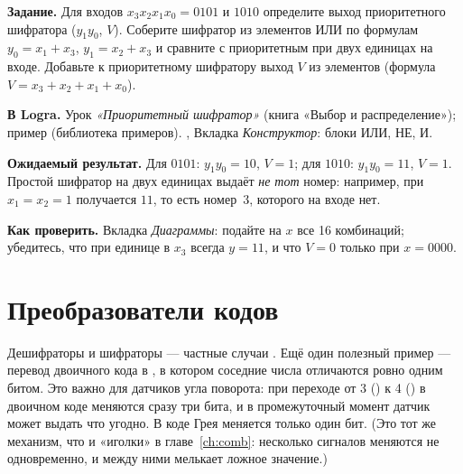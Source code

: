 \begin{diybox}
\textbf{Задание.}  Для входов $x_3x_2x_1x_0=0101$ и $1010$
определите выход приоритетного шифратора ($y_1y_0$, $V$). 
Соберите шифратор из элементов ИЛИ по формулам $y_0=x_1+x_3$,
$y_1=x_2+x_3$ и сравните с приоритетным при двух единицах на входе.
 Добавьте к приоритетному шифратору выход $V$ из элементов
(формула $V=x_3+x_2+x_1+x_0$).

\textbf{В Logra.}  Урок \emph{«Приоритетный шифратор»} (книга
«Выбор и распределение»); пример  (библиотека примеров).
,  Вкладка \emph{Конструктор}: блоки ИЛИ, НЕ, И.

\textbf{Ожидаемый результат.} Для $0101$: $y_1y_0=10$, $V=1$; для $1010$:
$y_1y_0=11$, $V=1$. Простой шифратор на двух единицах выдаёт
\emph{не тот} номер: например, при $x_1=x_2=1$ получается $11$, то есть
номер~3, которого на входе нет.

\textbf{Как проверить.} Вкладка \emph{Диаграммы}: подайте на $x$ все
16 комбинаций; убедитесь, что при единице в $x_3$ всегда $y=11$,
и что $V=0$ только при $x=0000$.
\end{diybox}

\section{Преобразователи кодов}

Дешифраторы и шифраторы --- частные случаи .
Ещё один полезный пример --- перевод двоичного кода в , в
котором соседние числа отличаются ровно одним битом. Это важно для датчиков
угла поворота: при переходе от 3 () к 4 () в двоичном коде
меняются сразу три бита, и в промежуточный момент датчик может выдать
что угодно. В коде Грея меняется только один бит. (Это тот же
механизм, что и «иголки» в главе~\ref{ch:comb}: несколько сигналов меняются
не одновременно, и между ними мелькает ложное значение.)

